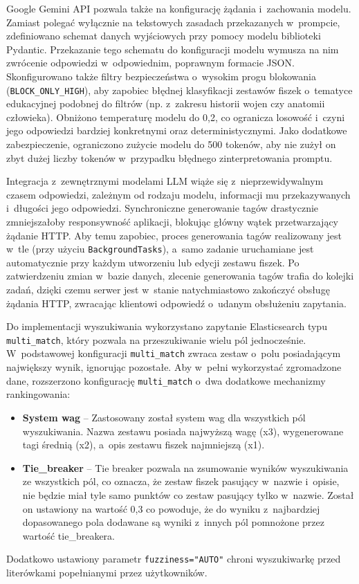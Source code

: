 Google Gemini API pozwala także na konfigurację żądania i~zachowania modelu. Zamiast polegać wyłącznie na tekstowych zasadach 
przekazanych w~prompcie, zdefiniowano schemat danych wyjściowych przy pomocy modelu biblioteki Pydantic. 
Przekazanie tego schematu do konfiguracji modelu wymusza na nim zwrócenie odpowiedzi w~odpowiednim, poprawnym formacie JSON. Skonfigurowano 
także filtry bezpieczeństwa o~wysokim progu blokowania (\texttt{BLOCK\_ONLY\_HIGH}), aby zapobiec błędnej klasyfikacji zestawów 
fiszek o~tematyce edukacyjnej podobnej do filtrów (np. z~zakresu historii wojen czy anatomii człowieka). Obniżono 
temperaturę modelu do 0,2, co ogranicza losowość i~czyni jego odpowiedzi bardziej konkretnymi oraz deterministycznymi. Jako dodatkowe 
zabezpieczenie, ograniczono zużycie modelu do 500 tokenów, aby nie zużył on zbyt dużej liczby tokenów w~przypadku błędnego zinterpretowania 
promptu.

Integracja z~zewnętrznymi modelami LLM wiąże się z~nieprzewidywalnym czasem odpowiedzi, zależnym od 
rodzaju modelu, informacji mu przekazywanych i~długości jego odpowiedzi. Synchroniczne generowanie tagów drastycznie 
zmniejszałoby responsywność aplikacji, blokując główny wątek przetwarzający żądanie HTTP. Aby temu zapobiec, proces 
generowania tagów realizowany jest w~tle (przy użyciu \texttt{BackgroundTasks}), a~samo zadanie uruchamiane jest automatycznie  
przy każdym utworzeniu lub edycji zestawu fiszek. Po zatwierdzeniu zmian w~bazie danych, zlecenie generowania tagów trafia do 
kolejki zadań, dzięki czemu serwer jest w~stanie natychmiastowo zakończyć obsługę żądania HTTP, zwracając klientowi odpowiedź o~udanym 
obsłużeniu zapytania.

Do implementacji wyszukiwania wykorzystano zapytanie Elasticsearch typu \texttt{multi\_match}, który pozwala na 
przeszukiwanie wielu pól jednocześnie. W~podstawowej konfiguracji \texttt{multi\_match} zwraca zestaw o~polu posiadającym największy wynik, 
ignorując pozostałe. Aby w~pełni wykorzystać zgromadzone dane, rozszerzono konfigurację \texttt{multi\_match} o~dwa dodatkowe mechanizmy 
rankingowania:
\begin{itemize}
    \item \textbf{System wag} -- Zastosowany został system wag dla wszystkich pól wyszukiwania. Nazwa zestawu posiada najwyższą wagę (x3),
    wygenerowane tagi średnią (x2), a~opis zestawu fiszek najmniejszą (x1).
    \item \textbf{Tie\_breaker} -- Tie breaker pozwala na zsumowanie wyników wyszukiwania ze wszystkich pól, co oznacza, że zestaw fiszek pasujący 
    w~nazwie i~opisie, nie będzie miał tyle samo punktów co zestaw pasujący tylko w~nazwie. Został on ustawiony na wartość 0,3 co powoduje, że do 
    wyniku z~najbardziej dopasowanego pola dodawane są wyniki z~innych pól pomnożone przez wartość tie\_breakera.
\end{itemize}
Dodatkowo ustawiony parametr \texttt{fuzziness="AUTO"} chroni wyszukiwarkę przed literówkami popełnianymi przez użytkowników.


